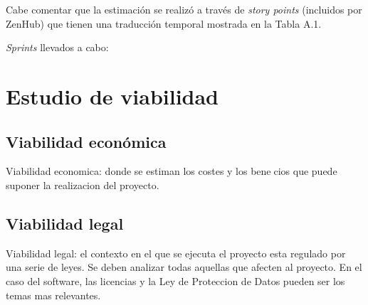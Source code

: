 Cabe comentar que la estimación se realizó a través de \textit{story points} (incluidos por ZenHub) que tienen una traducción temporal mostrada en la Tabla A.1.


\textit{Sprints} llevados a cabo:

\section{Estudio de viabilidad}

\subsection{Viabilidad económica}
Viabilidad economica: donde se estiman los costes y los benecios
que puede suponer la realizacion del proyecto.

\subsection{Viabilidad legal}
Viabilidad legal: el contexto en el que se ejecuta el proyecto esta regulado
por una serie de leyes. Se deben analizar todas aquellas que afecten
al proyecto. En el caso del software, las licencias y la Ley de Proteccion
de Datos pueden ser los temas mas relevantes.

